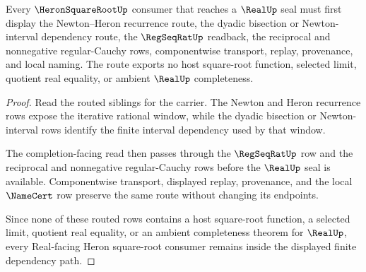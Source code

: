 \begin{theorem}
\label{thm:heron-square-root-real-route}
Every $\HeronSquareRootUp$ consumer that reaches a $\RealUp$ seal must first display the Newton--Heron recurrence route, the dyadic bisection or Newton-interval dependency route, the $\RegSeqRatUp$ readback, the reciprocal and nonnegative regular-Cauchy rows, componentwise transport, replay, provenance, and local naming. The route exports no host square-root function, selected limit, quotient real equality, or ambient $\RealUp$ completeness.
\end{theorem}
\begin{proof}
Read the routed siblings for the carrier. The Newton and Heron recurrence rows expose the iterative rational window, while the dyadic bisection or Newton-interval rows identify the finite interval dependency used by that window.

The completion-facing read then passes through the $\RegSeqRatUp$ row and the reciprocal and nonnegative regular-Cauchy rows before the $\RealUp$ seal is available. Componentwise transport, displayed replay, provenance, and the local $\NameCert$ row preserve the same route without changing its endpoints.

Since none of these routed rows contains a host square-root function, a selected limit, quotient real equality, or an ambient completeness theorem for $\RealUp$, every Real-facing Heron square-root consumer remains inside the displayed finite dependency path.
\end{proof}
